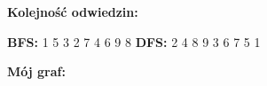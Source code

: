\documentclass[15pt, a4paper]{article}
\begin{document}
\vspace{0.5cm} 

\begin{center}
    \textbf{Kolejność odwiedzin:}
\end{center}

\vspace{0.3cm} 

\noindent
\textbf{BFS:} 1 5 3 2 7 4 6 9 8 \hfill \textbf{DFS:} 2 4 8 9 3 6 7 5 1

\vspace{1.5cm}


\begin{center}
    \textbf{Mój graf:}
\end{center}
\end{document}
